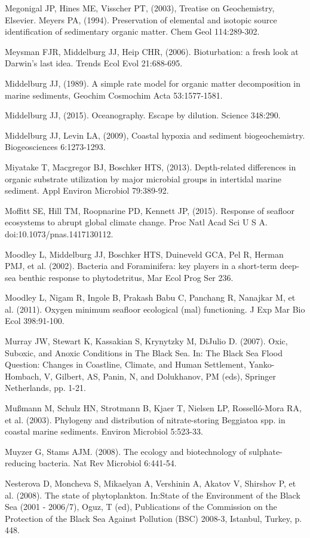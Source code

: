 Megonigal JP, Hines ME, Visscher PT, (2003), Treatise on Geochemistry, Elsevier.
Meyers PA, (1994). Preservation of elemental and isotopic source identification of sedimentary organic matter. Chem Geol 114:289-302.

Meysman FJR, Middelburg JJ, Heip CHR, (2006). Bioturbation: a fresh look at Darwin’s last idea. Trends Ecol Evol 21:688-695.

Middelburg JJ, (1989). A simple rate model for organic matter decomposition in marine sediments, Geochim Cosmochim Acta 53:1577-1581.

Middelburg JJ, (2015). Oceanography. Escape by dilution. Science 348:290.

Middelburg JJ, Levin LA, (2009), Coastal hypoxia and sediment biogeochemistry. Biogeosciences 6:1273-1293.

Miyatake T, Macgregor BJ, Boschker HTS, (2013). Depth-related differences in organic substrate utilization by major microbial groups in intertidal marine sediment. Appl Environ Microbiol 79:389-92.

Moffitt SE, Hill TM, Roopnarine PD, Kennett JP, (2015). Response of seafloor ecosystems to abrupt global climate change. Proc Natl Acad Sci U S A. doi:10.1073/pnas.1417130112.

Moodley L, Middelburg JJ, Boschker HTS, Duineveld GCA, Pel R, Herman PMJ, et al. (2002). Bacteria and Foraminifera: key players in a short-term deep-sea benthic response to phytodetritus, Mar Ecol Prog Ser 236.

Moodley L, Nigam R, Ingole B, Prakash Babu C, Panchang R, Nanajkar M, et al. (2011). Oxygen minimum seafloor ecological (mal) functioning. J Exp Mar Bio Ecol 398:91-100.

Murray JW, Stewart K, Kassakian S, Krynytzky M, DiJulio D. (2007). Oxic, Suboxic, and Anoxic Conditions in The Black Sea. In: The Black Sea Flood Question: Changes in Coastline, Climate, and Human Settlement, Yanko-Hombach, V, Gilbert, AS, Panin, N, and Dolukhanov, PM (eds), Springer Netherlands, pp. 1-21.

Mu{\ss}mann M, Schulz HN, Strotmann B, Kjaer T, Nielsen LP, Rosselló-Mora RA, et al. (2003). Phylogeny and distribution of nitrate-storing Beggiatoa spp. in coastal marine sediments. Environ Microbiol 5:523-33.

Muyzer G, Stams AJM. (2008). The ecology and biotechnology of sulphate-reducing bacteria. Nat Rev Microbiol 6:441-54.

Nesterova D, Moncheva S, Mikaelyan A, Vershinin A, Akatov V, Shirshov P, et al. (2008). The state of phytoplankton. In:State of the Environment of the Black Sea (2001 - 2006/7), Oguz, T (ed), Publications of the Commission on the Protection of the Black Sea Against Pollution (BSC) 2008-3, Istanbul, Turkey, p. 448.

